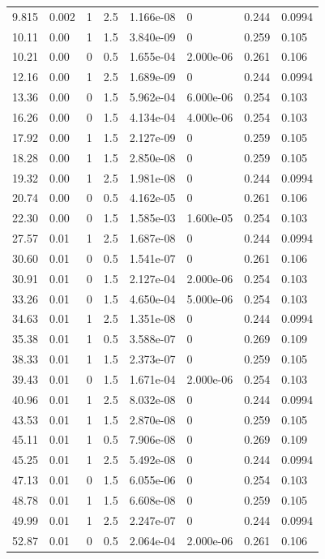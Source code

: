 \documentclass[preview]{standalone}
\begin{document}
{{\begin{tabular}{L{1.2cm}C{1.2cm} C{0.3cm}C{0.5cm} C{1.4cm}C{1.4cm} C{1.4cm}C{1.4cm}}
  9.815  &  0.002  & 1     & 2.5 &  1.166e-08  & 0  & 0.244 &  0.0994   \\ 
  10.11  &  0.00  & 1     & 1.5 &  3.840e-09  & 0  & 0.259 &  0.105   \\ 
  10.21  &  0.00  & 0     & 0.5 &  1.655e-04  & 2.000e-06  & 0.261 &  0.106   \\ 
  12.16  &  0.00  & 1     & 2.5 &  1.689e-09  & 0  & 0.244 &  0.0994   \\ 
  13.36  &  0.00  & 0     & 1.5 &  5.962e-04  & 6.000e-06  & 0.254 &  0.103   \\ 
  16.26  &  0.00  & 0     & 1.5 &  4.134e-04  & 4.000e-06  & 0.254 &  0.103   \\ 
  17.92  &  0.00  & 1     & 1.5 &  2.127e-09  & 0  & 0.259 &  0.105   \\ 
  18.28  &  0.00  & 1     & 1.5 &  2.850e-08  & 0  & 0.259 &  0.105   \\ 
  19.32  &  0.00  & 1     & 2.5 &  1.981e-08  & 0  & 0.244 &  0.0994   \\ 
  20.74  &  0.00  & 0     & 0.5 &  4.162e-05  & 0  & 0.261 &  0.106   \\ 
  22.30  &  0.00  & 0     & 1.5 &  1.585e-03  & 1.600e-05  & 0.254 &  0.103   \\ 
  27.57  &  0.01  & 1     & 2.5 &  1.687e-08  & 0  & 0.244 &  0.0994   \\ 
  30.60  &  0.01  & 0     & 0.5 &  1.541e-07  & 0  & 0.261 &  0.106   \\ 
  30.91  &  0.01  & 0     & 1.5 &  2.127e-04  & 2.000e-06  & 0.254 &  0.103   \\ 
  33.26  &  0.01  & 0     & 1.5 &  4.650e-04  & 5.000e-06  & 0.254 &  0.103   \\ 
  34.63  &  0.01  & 1     & 2.5 &  1.351e-08  & 0  & 0.244 &  0.0994   \\ 
  35.38  &  0.01  & 1     & 0.5 &  3.588e-07  & 0  & 0.269 &  0.109   \\ 
  38.33  &  0.01  & 1     & 1.5 &  2.373e-07  & 0  & 0.259 &  0.105   \\ 
  39.43  &  0.01  & 0     & 1.5 &  1.671e-04  & 2.000e-06  & 0.254 &  0.103   \\ 
  40.96  &  0.01  & 1     & 2.5 &  8.032e-08  & 0  & 0.244 &  0.0994   \\ 
  43.53  &  0.01  & 1     & 1.5 &  2.870e-08  & 0  & 0.259 &  0.105   \\ 
  45.11  &  0.01  & 1     & 0.5 &  7.906e-08  & 0  & 0.269 &  0.109   \\ 
  45.25  &  0.01  & 1     & 2.5 &  5.492e-08  & 0  & 0.244 &  0.0994   \\ 
  47.13  &  0.01  & 0     & 1.5 &  6.055e-06  & 0  & 0.254 &  0.103   \\ 
  48.78  &  0.01  & 1     & 1.5 &  6.608e-08  & 0  & 0.259 &  0.105   \\ 
  49.99  &  0.01  & 1     & 2.5 &  2.247e-07  & 0  & 0.244 &  0.0994   \\ 
  52.87  &  0.01  & 0     & 0.5 &  2.064e-04  & 2.000e-06  & 0.261 &  0.106   \\ 
\hline 
\end{tabular} 

}}
\end{document}
